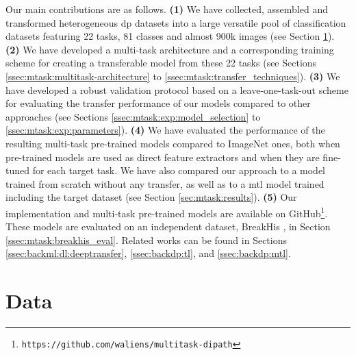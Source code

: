 Our main contributions are as follows. \textbf{(1)} We have collected, assembled and transformed heterogeneous \acrlong{dp} datasets into a large versatile pool of classification datasets featuring 22 tasks, 81 classes and almost 900k images (see Section \ref{sec:mtask:data}). \textbf{(2)} We have developed a multi-task architecture and a corresponding training scheme for creating a transferable model from these 22 tasks (see Sections \ref{ssec:mtask:multitask-architecture} to \ref{ssec:mtask:transfer_techniques}). \textbf{(3)} We have developed a robust validation protocol based on a leave-one-task-out scheme for evaluating the transfer performance of our models compared to other approaches (see Sections \ref{ssec:mtask:exp:model_selection} to \ref{ssec:mtask:exp:parameters}). \textbf{(4)} We have evaluated the performance of the resulting multi-task pre-trained models compared to ImageNet ones, both when pre-trained models are used as direct feature extractors and when they are fine-tuned for each target task. We have also compared our approach to a model trained from scratch without any transfer, as well as to a \acrlong{mtl} model trained including the target dataset (see Section \ref{sec:mtask:results}). \textbf{(5)} Our implementation and multi-task pre-trained models are available on GitHub\footnote{\texttt{https://github.com/waliens/multitask-dipath}}. These models are evaluated on an independent dataset, BreakHis \cite{spanhol2015dataset}, in Section \ref{ssec:mtask:breakhis_eval}. Related works can be found in Sections \ref{ssec:backml:dl:deeptransfer}, \ref{ssec:backdp:tl}, and \ref{ssec:backdp:mtl}.  

\section{Data}
\label{sec:mtask:data}


